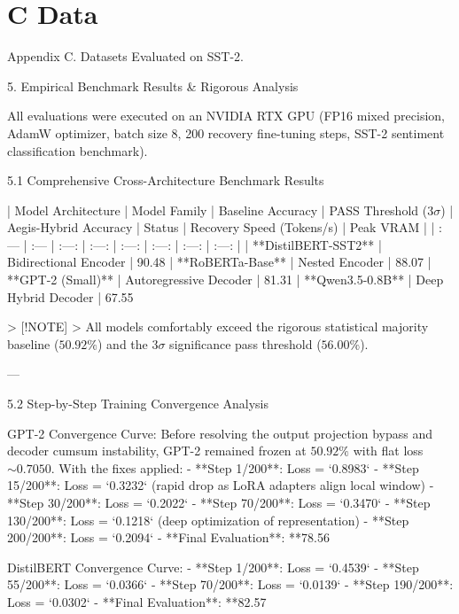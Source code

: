 \section{C Data}

 Appendix C. Datasets
Evaluated on SST-2.


 5. Empirical Benchmark Results \& Rigorous Analysis


All evaluations were executed on an NVIDIA RTX GPU (FP16 mixed precision, AdamW optimizer, batch size 8, 200 recovery fine-tuning steps, SST-2 sentiment classification benchmark).

 5.1 Comprehensive Cross-Architecture Benchmark Results

| Model Architecture | Model Family | Baseline Accuracy | PASS Threshold ($3\sigma$) | Aegis-Hybrid Accuracy | Status | Recovery Speed (Tokens/s) | Peak VRAM |
| :--- | :--- | :---: | :---: | :---: | :---: | :---: | :---: |
| **DistilBERT-SST2** | Bidirectional Encoder | 90.48%
| **RoBERTa-Base** | Nested Encoder | 88.07%
| **GPT-2 (Small)** | Autoregressive Decoder | 81.31%
| **Qwen3.5-0.8B** | Deep Hybrid Decoder | 67.55%

> [!NOTE]
> All models comfortably exceed the rigorous statistical majority baseline ($50.92\%$) and the $3\sigma$ significance pass threshold ($56.00\%$).

---

 5.2 Step-by-Step Training Convergence Analysis

 GPT-2 Convergence Curve:
Before resolving the output projection bypass and decoder cumsum instability, GPT-2 remained frozen at $50.92\%$ with flat loss $\sim 0.7050$. With the fixes applied:
- **Step 1/200**: Loss = `0.8983`
- **Step 15/200**: Loss = `0.3232` (rapid drop as LoRA adapters align local window)
- **Step 30/200**: Loss = `0.2022`
- **Step 70/200**: Loss = `0.3470`
- **Step 130/200**: Loss = `0.1218` (deep optimization of representation)
- **Step 200/200**: Loss = `0.2094`
- **Final Evaluation**: **78.56%

 DistilBERT Convergence Curve:
- **Step 1/200**: Loss = `0.4539`
- **Step 55/200**: Loss = `0.0366`
- **Step 70/200**: Loss = `0.0139`
- **Step 190/200**: Loss = `0.0302`
- **Final Evaluation**: **82.57%

